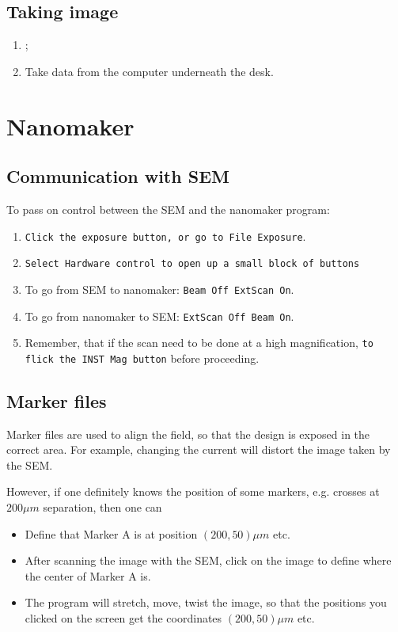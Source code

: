   \subsection{Taking image}
  \begin{enumerate}
  \item {} \ira {} \ira {};
  \item Take data from the computer underneath the desk.
  \end{enumerate}
  \newpage

  \section{Nanomaker\label{sec:nanomaker}}
  \subsection{Communication with SEM}
  To pass on control between the SEM and the nanomaker program:

  \begin{enumerate}
  \item  \texttt{Click  the  exposure  button,  or  go  to  File  \ira
      Exposure}.
  \item \texttt{Select  Hardware control to  open up a small  block of
      buttons}
  \item To  go from  SEM to nanomaker:  \texttt{Beam Off  \ira ExtScan
      On}.
  \item To  go from  nanomaker to SEM:  \texttt{ExtScan Off  \ira Beam
      On}.
  \item  Remember,  that  if the  scan  need  to  be  done at  a  high
    magnification,  \texttt{to  flick  the  INST  Mag  button}  before
    proceeding.
  \end{enumerate}

 \subsection{Marker files}
 Marker  files are  used to  align the  field, so  that the  design is
 exposed in the  correct area. For example, changing  the current will
 distort the image taken by the SEM.

 However,  if  one definitely  knows  the  position of  some  markers,
 e.g. crosses at $200\mu m$ separation, then one can
 \begin{itemize}
 \item Define that Marker A is at position $(200,50)\mu m$ etc.
 \item After  scanning the image with  the SEM, click on  the image to
   define where the center of Marker A is.
 \item The  program will stretch, move,  twist the image, so  that the
   positions   you  clicked   on  the   screen  get   the  coordinates
   $(200,50)\mu m$ etc.
 \end{itemize}

